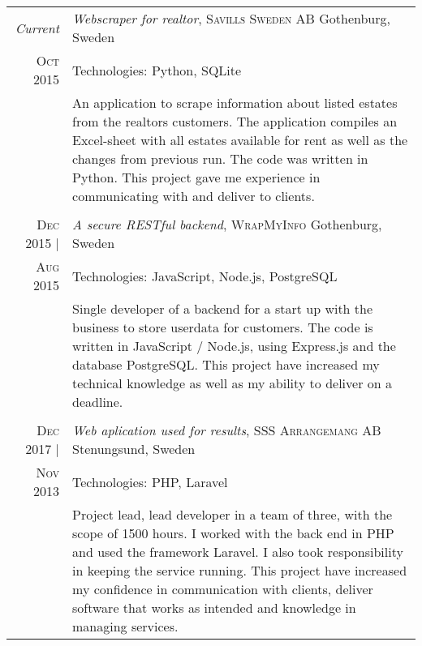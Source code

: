 \documentclass[a4paper,10pt]{scrartcl} %
\begin{document}
\begin{tabular}{r|p{15cm}}

\emph{Current} 	                    & \emph{Webscraper for realtor}, \textsc{Savills Sweden AB} \hfill Gothenburg, Sweden \\
\textsc{Oct 2015}                   & \footnotesize{Technologies: Python, SQLite} \\
\phantom{abcdefghijklm}             & \footnotesize{
An application to scrape information about listed estates from the realtors customers. The application compiles an Excel-sheet with all estates available for rent as well as the changes from previous run. The code was written in Python. This project gave me experience in communicating with and deliver to clients.} \\
\multicolumn{2}{c}{} \\


\textsc{Dec 2015} |	                & \emph{A secure RESTful backend}, \textsc{WrapMyInfo} \hfill Gothenburg, Sweden \\
\textsc{Aug 2015} 	                & \footnotesize{Technologies: JavaScript, Node.js, PostgreSQL} \\
				                    & \footnotesize{
Single developer of a backend for a start up with the business to store userdata for customers. The code is written in JavaScript / Node.js, using Express.js and the database PostgreSQL. This project have increased my technical knowledge as well as my ability to deliver on a deadline.}\\
\multicolumn{2}{c}{} \\


\textsc{Dec 2017} |                 & \emph{Web aplication used for results}, \textsc{SSS Arrangemang AB} \hfill Stenungsund, Sweden \\
\textsc{Nov 2013} 	                & \footnotesize{Technologies: PHP, Laravel} \\
					                & \footnotesize{
Project lead, lead developer in a team of three, with the scope of 1500 hours. I worked with the back end in PHP and used the framework Laravel. I also took responsibility in keeping the service running. This project have increased my confidence in communication with clients, deliver software that works as intended and knowledge in managing services.}\\

\end{tabular}
\end{document}
